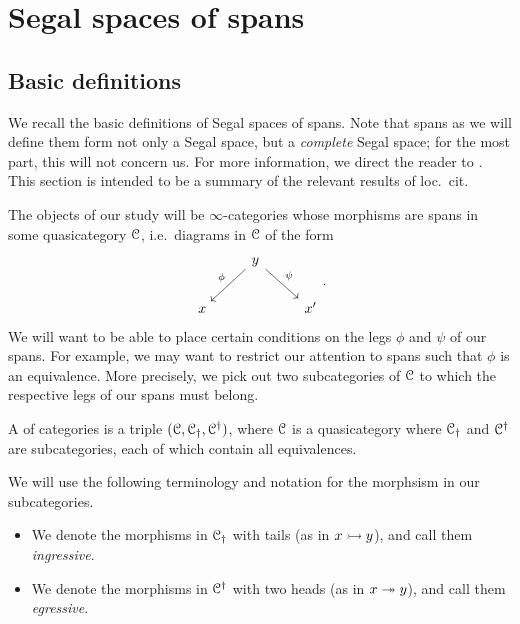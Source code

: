 \documentclass[main.tex]{subfiles}
\begin{document}
\section{Segal spaces of spans}
\label{sec:segal_spaces_of_spans}

\subsection{Basic definitions}

We recall the basic definitions of Segal spaces of spans. Note that spans as we will define them form not only a Segal space, but a \emph{complete} Segal space; for the most part, this will not concern us. For more information, we direct the reader to \cite{spectralmackeyfunctors1}. This section is intended to be a summary of the relevant results of loc.\ cit.

The objects of our study will be $\infty$-categories whose morphisms are spans in some quasicategory $\mathcal{C}$, i.e.\ diagrams in $\mathcal{C}$ of the form
\begin{equation*}
  \begin{tikzcd}
    & y
    \arrow[dl, swap, "\phi"]
    \arrow[dr, "\psi"]
    \\
    x
    && x'
  \end{tikzcd}.
\end{equation*}
We will want to be able to place certain conditions on the legs $\phi$ and $\psi$ of our spans. For example, we may want to restrict our attention to spans such that $\phi$ is an equivalence. More precisely, we pick out two subcategories of $\mathcal{C}$ to which the respective legs of our spans must belong.

\begin{definition}
  A  of categories is a triple $(\mathcal{C}, \mathcal{C}_{\dagger}, \mathcal{C}^{\dagger})$, where $\mathcal{C}$ is a quasicategory where $\mathcal{C}_{\dagger}$ and $\mathcal{C}^{\dagger}$ are subcategories, each of which contain all equivalences.
\end{definition}

We will use the following terminology and notation for the morphsism in our subcategories.
\begin{itemize}
  \item We denote the morphisms in $\mathcal{C}_{\dagger}$ with tails (as in $x \rightarrowtail y$), and call them \emph{ingressive}.

  \item We denote the morphisms in $\mathcal{C}^{\dagger}$ with two heads (as in $x \twoheadrightarrow y$), and call them \emph{egressive}.
\end{itemize}
\end{document}
